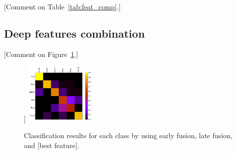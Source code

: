 \documentclass[10pt,conference]{IEEEtran}
\newcommand{\jef}[1]{\textcolor[rgb]{1,0,0}{[#1]}}
\begin{document}
\jef{Comment on Table~\ref{tab:feat_comp}.\vspace{3cm}}

\begin{table}[h!]
	\caption{Classification results with different deep representation levels.}
	\label{tab:feat_comp}
\end{table}


\subsection{Deep features combination}

\jef{Comment on Figure~\ref{fig:feat_comb}.\vspace{3cm}}

\begin{figure}[ht!]
	\centering
	\scriptsize
	\hspace{1mm}
	\hspace{1mm}
	\subfloat[\jef{best feature}]{
		\includegraphics[width=0.30\textwidth, keepaspectratio=true]{figs/heatmap_example.pdf}
	}
	\caption{Classification results for each class by using early fusion, late fusion, and \jef{best feature}.}
	\label{fig:feat_comb}
\end{figure}
\end{document}

